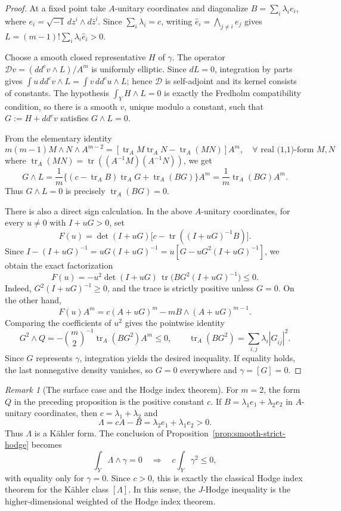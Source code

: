 \documentclass[reqno]{amsart}
\newcommand{\tr}{\operatorname{tr}}
\newcommand{\ddc}{dd^c}
\theoremstyle{plain}
\theoremstyle{remark}
\newtheorem{remark}[thm]{Remark}
\begin{document}
\begin{proof}
At a fixed point take $A$-unitary coordinates and diagonalize
$B=\sum_i\lambda_i e_i$, where $e_i=\sqrt{-1}\,dz^i\wedge
d\bar z^i$. Since $\sum_i\lambda_i=c$, writing
$\widehat e_i=\bigwedge_{j\ne i}e_j$ gives
$L=(m-1)!\sum_i\lambda_i\widehat e_i>0$.

Choose a smooth closed representative $H$ of $\gamma$.  The
operator $\mathcal Dv=(\ddc v\wedge L)/A^m$ is uniformly
elliptic.  Since $d L=0$, integration by parts gives
$\int u\,\ddc v\wedge L=\int v\,\ddc u\wedge L$; hence
$\mathcal D$ is self-adjoint and its kernel consists of constants.
The hypothesis $\int_YH\wedge L=0$ is exactly the Fredholm
compatibility condition, so there is a smooth $v$, unique modulo a
constant, such that $G:=H+\ddc v$ satisfies $G\wedge L=0$.

From the elementary identity \[
m(m-1)M\wedge N\wedge A^{m-2}=[\tr_{A}M\tr_A N-\tr_A(MN)]A^{m}, \quad \forall \text{ real (1,1)-form }M,N
\] where $\tr_A(MN)=\tr((A^{-1}M)(A^{-1}N))$, we get
\[
 G\wedge L
 =\frac1m\{(c-\tr_A B)\tr_A G+\tr_A(BG)\}A^m
 =\frac1m\tr_A(BG)A^m.
\]
  Thus
$G\wedge L=0$ is precisely $\tr_A(BG)=0$.

There is also a direct sign calculation.  In the above $A$-unitary coordinates,
for every $u\ne0$ with $I+uG>0$,  set
\[
 F(u)=\det(I+uG)\bigl[c-\tr((I+uG)^{-1}B)\bigr].
\]
Since  $I-(I+uG)^{-1}=uG(I+uG)^{-1}=u[G-uG^2(I+uG)^{-1}]$, we obtain the exact factorization
\[
 F(u)=-u^2\det(I+uG)\,
 \tr\bigl(BG^2(I+uG)^{-1}\bigr)\leq0.
\]
Indeed, $G^2(I+uG)^{-1}\geq0$, and the trace is strictly positive
unless $G=0$.  On the other hand,
\[
 F(u)A^m=c(A+uG)^m-mB\wedge(A+uG)^{m-1}.
\]
Comparing the coefficients of $u^2$ gives the pointwise identity
\[
 G^2\wedge Q
 =-\binom{m}{2}^{-1}\tr_A(BG^2)A^m\leq0,
 \qquad
 \tr_A(BG^2)=\sum_{i,j}\lambda_i|G_{i\bar j}|^2.
\]
Since $G$ represents $\gamma$, integration yields the desired
inequality.  If equality holds, the last nonnegative density vanishes,
so $G=0$ everywhere and $\gamma=[G]=0$.
\end{proof}
\begin{remark}[The surface case and the Hodge index theorem]
For $m=2$, the form $Q$ in the preceding proposition is the positive
constant $c$. If
$B=\lambda_1e_1+\lambda_2e_2$ in $A$-unitary coordinates, then
$c=\lambda_1+\lambda_2$ and
\[
 \Lambda=cA-B=\lambda_2e_1+\lambda_1e_2>0.
\]
Thus $\Lambda$ is a K\"ahler form.  The conclusion of
Proposition~\ref{prop:smooth-strict-hodge} becomes
\[
 \int_Y\Lambda\wedge\gamma=0
 \quad\Longrightarrow\quad
 c\int_Y\gamma^2\leq0,
\]
with equality only for $\gamma=0$.  Since $c>0$, this is exactly
the classical Hodge index theorem for the K\"ahler class
$[\Lambda]$.  In this sense, the $J$-Hodge inequality is the
higher-dimensional weighted of the Hodge index theorem.
\end{remark}
\end{document}

